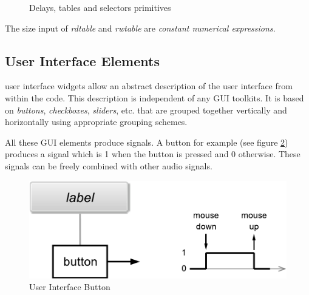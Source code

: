 \begin{figure}
\caption{Delays, tables and selectors primitives }
\label{fig-delays}
\end{figure}

The size input of \textit{rdtable} and \textit{rwtable} are \textit{constant numerical expressions}.

\subsection{User Interface Elements}

\faust user interface widgets allow an abstract description of the user interface from within the \faust code. This description is
independent of any GUI toolkits. It is based on \emph{buttons}, \emph{checkboxes}, \emph{sliders}, etc. that are grouped together 
vertically and horizontally using appropriate grouping schemes.

All these GUI elements produce signals. A button for example (see figure \ref{fig-button}) produces a signal which is 1 when the button is pressed and 0 otherwise. These signals can be freely combined with other audio signals. 

\begin{figure}[h]
\centering
\includegraphics[scale=0.5]{illustrations/button}
\caption{User Interface Button}
\label{fig-button}
\end{figure}

\bigskip

